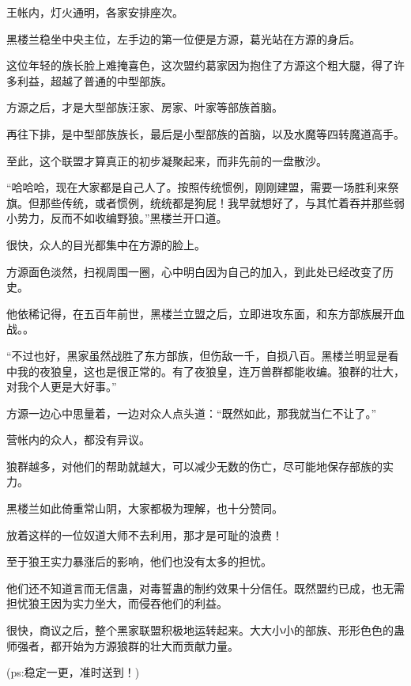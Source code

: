 \begin{this_body}
王帐内，灯火通明，各家安排座次。

黑楼兰稳坐中央主位，左手边的第一位便是方源，葛光站在方源的身后。

这位年轻的族长脸上难掩喜色，这次盟约葛家因为抱住了方源这个粗大腿，得了许多利益，超越了普通的中型部族。

方源之后，才是大型部族汪家、房家、叶家等部族首脑。

再往下排，是中型部族族长，最后是小型部族的首脑，以及水魔等四转魔道高手。

至此，这个联盟才算真正的初步凝聚起来，而非先前的一盘散沙。

“哈哈哈，现在大家都是自己人了。按照传统惯例，刚刚建盟，需要一场胜利来祭旗。但那些传统，或者惯例，统统都是狗屁！我早就想好了，与其忙着吞并那些弱小势力，反而不如收编野狼。”黑楼兰开口道。

很快，众人的目光都集中在方源的脸上。

方源面色淡然，扫视周围一圈，心中明白因为自己的加入，到此处已经改变了历史。

他依稀记得，在五百年前世，黑楼兰立盟之后，立即进攻东面，和东方部族展开血战。。

“不过也好，黑家虽然战胜了东方部族，但伤敌一千，自损八百。黑楼兰明显是看中我的夜狼皇，这也是很正常的。有了夜狼皇，连万兽群都能收编。狼群的壮大，对我个人更是大好事。”

方源一边心中思量着，一边对众人点头道：“既然如此，那我就当仁不让了。”

营帐内的众人，都没有异议。

狼群越多，对他们的帮助就越大，可以减少无数的伤亡，尽可能地保存部族的实力。

黑楼兰如此倚重常山阴，大家都极为理解，也十分赞同。

放着这样的一位奴道大师不去利用，那才是可耻的浪费！

至于狼王实力暴涨后的影响，他们也没有太多的担忧。

他们还不知道言而无信蛊，对毒誓蛊的制约效果十分信任。既然盟约已成，也无需担忧狼王因为实力坐大，而侵吞他们的利益。

很快，商议之后，整个黑家联盟积极地运转起来。大大小小的部族、形形色色的蛊师强者，都开始为方源狼群的壮大而贡献力量。

(ps:稳定一更，准时送到！)

\end{this_body}

